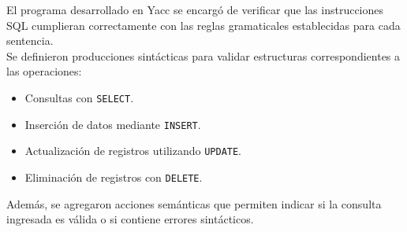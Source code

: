\documentclass{article}
\begin{document}
El programa desarrollado en Yacc se encargó de verificar que las instrucciones SQL cumplieran correctamente con las reglas gramaticales establecidas para cada sentencia. \\

Se definieron producciones sintácticas para validar estructuras correspondientes a las operaciones:

\begin{itemize}
    \item Consultas con \texttt{SELECT}.
    \item Inserción de datos mediante \texttt{INSERT}.
    \item Actualización de registros utilizando \texttt{UPDATE}.
    \item Eliminación de registros con \texttt{DELETE}.
\end{itemize}

Además, se agregaron acciones semánticas que permiten indicar si la consulta ingresada es válida o si contiene errores sintácticos.
\end{document}
